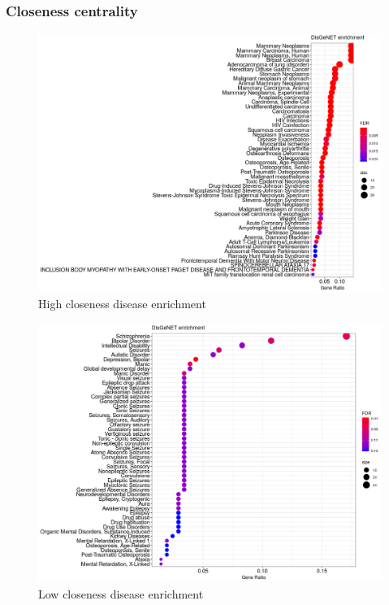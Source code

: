 \subsubsection{Closeness centrality}



\begin{figure}
    \centering
    \includegraphics[width=\textwidth]{images/Rplot_high_closeness.png}
    \caption{High closeness disease enrichment}
    \label{fig:high closeness disease enrichment}
\end{figure}

\begin{figure}
    \centering
    \includegraphics[width=\textwidth]{images/Rplot_low_closeness.png}
    \caption{Low closeness disease enrichment}
    \label{fig:low closeness disease enrichment}
\end{figure}



